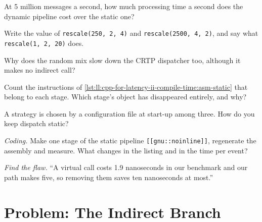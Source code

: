\begin{exercise}[$\star$]\label{exo:ll:cpp-for-latency-ii-compile-time:2}
At 5 million messages a second, how much processing time a second does the dynamic pipeline cost over the static one?
\end{exercise}

\begin{exercise}[$\star$]\label{exo:ll:cpp-for-latency-ii-compile-time:3}
Write the value of \texttt{rescale(250, 2, 4)} and \texttt{rescale(2500, 4, 2)}, and say what \texttt{rescale(1, 2, 20)}
does.
\end{exercise}

\begin{exercise}[$\star\star$]\label{exo:ll:cpp-for-latency-ii-compile-time:4}
Why does the random mix slow down the CRTP dispatcher too, although it makes no indirect call?
\end{exercise}

\begin{exercise}[$\star\star$]\label{exo:ll:cpp-for-latency-ii-compile-time:5}
Count the instructions of \cref{lst:ll:cpp-for-latency-ii-compile-time:asm-static} that belong to each stage. Which stage's
object has disappeared entirely, and why?
\end{exercise}

\begin{exercise}[$\star\star$]\label{exo:ll:cpp-for-latency-ii-compile-time:6}
A strategy is chosen by a configuration file at start-up among three. How do you keep dispatch static?
\end{exercise}

\begin{exercise}[$\star\star\star$]\label{exo:ll:cpp-for-latency-ii-compile-time:7}
\emph{Coding.} Make one stage of the static pipeline \texttt{[[gnu::noinline]]}, regenerate the assembly and measure. What
changes in the listing and in the time per event?
\end{exercise}

\begin{exercise}[$\star\star\star$]\label{exo:ll:cpp-for-latency-ii-compile-time:8}
\emph{Find the flaw.} ``A virtual call costs 1.9 nanoseconds in our benchmark and our path makes five, so removing them
saves ten nanoseconds at most.''
\end{exercise}

\section{Problem: The Indirect Branch}

